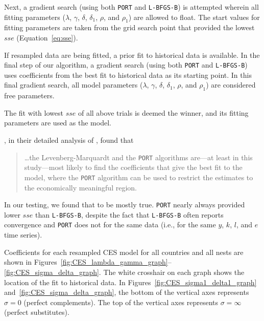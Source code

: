 \documentclass[preprint,authoryear,12pt]{elsarticle}\usepackage[]{graphicx}\usepackage[]{color}
\begin{document}
Next, a gradient search (using both \texttt{PORT} and \texttt{L-BFGS-B}) 
is attempted wherein all fitting parameters 
($\lambda$, $\gamma$, $\delta$, $\delta_1$, $\rho$, and $\rho_1$)
are allowed to float. 
The start values for fitting parameters are taken from 
the grid search point that provided the lowest $sse$ (Equation~\ref{eq:sse}).

If resampled data are being fitted, a prior fit to historical data is available.
In the final step of our algorithm, 
a gradient search (using both \texttt{PORT} and \texttt{L-BFGS-B})
uses coefficients from the best 
fit to historical data as its starting point. 
In this final gradient search, all model parameters 
($\lambda$, $\gamma$, $\delta$, $\delta_1$, $\rho$, and $\rho_1$)
are considered free parameters.

The fit with lowest $sse$ of all above trials is deemed the winner,
and its fitting parameters are used as the model.

\citet{Henningsen:2011td}, 
in their detailed analysis of \citet{Kemfert:1998vd}, found that 

\begin{quote}
\ldots the Levenberg-Marquardt and the \texttt{PORT} algorithms 
are---at least in this study---most likely to find the 
coefficients that give the best fit to the model, 
where the \texttt{PORT} algorithm can be used to restrict the estimates 
to the economically meaningful region.
\end{quote}

In our testing, we found that to be mostly true. 
\texttt{PORT} nearly always provided lower
$sse$ than \texttt{L-BFGS-B}, despite the fact that 
\texttt{L-BFGS-B} often reports convergence
and \texttt{PORT} does not for the same data
(i.e., for the same $y$, $k$, $l$, and $e$ time series).

Coefficients for each resampled CES model for all countries and all nests
are shown in 
Figures~\ref{fig:CES_lambda_gamma_graph}--\ref{fig:CES_sigma_delta_graph}. 
The white crosshair on each graph shows the location 
of the fit to historical data. 
In Figures~\ref{fig:CES_sigma1_delta1_graph} and~\ref{fig:CES_sigma_delta_graph},
the bottom of the vertical axes represents $\sigma = 0$ (perfect complements).
The top of the vertical axes represents $\sigma = \infty$ (perfect substitutes).
\end{document}
